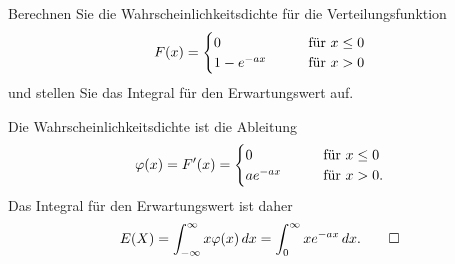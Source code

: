 Berechnen Sie die Wahrscheinlichkeitsdichte für die Verteilungsfunktion
\[
F(x)
=
\begin{cases}
0        &\qquad \text{für $x\le 0$}\\
1-e^{-ax}&\qquad \text{für $ x>0$}
\end{cases}
\]
und stellen Sie das Integral für den Erwartungswert auf.


\begin{loesung}
Die Wahrscheinlichkeitsdichte ist die Ableitung
\[
\varphi(x)
=
F'(x)
=
\begin{cases}
0        &\qquad \text{für $x\le 0$}\\
ae^{-ax} &\qquad \text{für $ x>0$.}
\end{cases}
\]
Das Integral für den Erwartungswert ist daher
\[
E(X)
=
\int_{-\infty}^\infty x \varphi(x)\,dx
=
\int_0^\infty  x e^{-ax}\,dx.
\qedhere
\]
\end{loesung}

